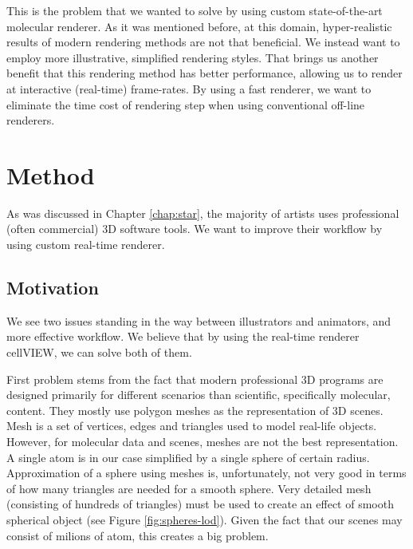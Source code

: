 \documentclass[
  digital, %
  table,   %
  nolof,     %
  nolot,     %
  oneside,
]{fithesis3}
\begin{document}
This is the problem that we wanted to solve by using custom state-of-the-art molecular renderer. As it was mentioned before, at this domain, hyper-realistic results of modern rendering methods are not that beneficial. We instead want to employ more illustrative, simplified rendering styles. That brings us another benefit that this rendering method has better performance, allowing us to render at interactive (real-time) frame-rates. By using a fast renderer, we want to eliminate the time cost of rendering step when using conventional off-line renderers.

\chapter{Method}
\label{chap:method}
As was discussed in Chapter \ref{chap:star}, the majority of artists uses professional (often commercial) 3D software tools. We want to improve their workflow by using custom real-time renderer.


\section{Motivation}
We see two issues standing in the way between illustrators and animators, and more effective workflow. We believe that by using the real-time renderer cellVIEW, we can solve both of them.

First problem stems from the fact that modern professional 3D programs are designed primarily for different scenarios than scientific, specifically molecular, content. They mostly use polygon meshes as the representation of 3D scenes. Mesh is a set of vertices, edges and triangles used to model real-life objects. However, for molecular data and scenes, meshes are not the best representation. A single atom is in our case simplified by a single sphere of certain radius. Approximation of a sphere using meshes is, unfortunately, not very good in terms of how many triangles are needed for a smooth sphere. Very detailed mesh (consisting of hundreds of triangles) must be used to create an effect of smooth spherical object (see Figure \ref{fig:spheres-lod}). Given the fact that our scenes may consist of milions of atom, this creates a big problem.
\end{document}
